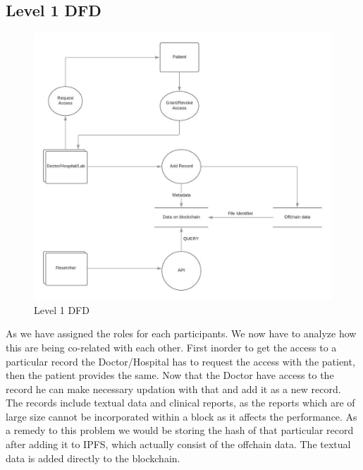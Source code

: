 \documentclass[11pt]{report}
\begin{document}
    \subsection{Level 1 DFD}
    \begin{figure}[h!]
        \centering
        \includegraphics[height=10cm]{DFD1.jpg}
        \caption{Level 1 DFD}
        \label{fig:my_label}
    \end{figure}
    \par As we have assigned the roles for each participants. We now have to analyze how this are being co-related with each other. First inorder to get the access to a particular record the Doctor/Hospital has to request the access with the patient, then the patient provides the same. Now that the Doctor have access to the record he can make necessary updation with that and add it as a new record. The records include textual data and clinical reports, as the reports which are of large size cannot be incorporated within a block as it affects the performance. As a remedy to this problem we would be storing the hash of that particular record after adding it to IPFS, which actually consist of the offchain data. The textual data is added directly to the blockchain.
    
    \newpage
\end{document}
